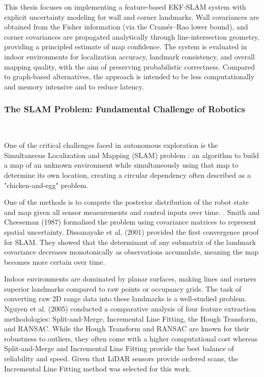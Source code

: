 \documentclass[11pt]{article}
\begin{document}
This thesis focuses on implementing a feature‑based EKF‑SLAM system with explicit uncertainty modeling for wall and corner landmarks. Wall covariances are obtained from the Fisher information (via the Cramér–Rao lower bound), and corner covariances are propagated analytically through line‑intersection geometry, providing a principled estimate of map confidence. The system is evaluated in indoor environments for localization accuracy, landmark consistency, and overall mapping quality, with the aim of preserving probabilistic correctness. Compared to graph‑based alternatives, the approach is intended to be less computationally and memory intensive and to reduce latency.




\subsubsection{The SLAM Problem: Fundamental Challenge of Robotics} 

One of the critical challenges faced in autonomous exploration is the Simultaneous Localization and Mapping (SLAM) problem \cite{durrant2006slam}: an algorithm to build a map of an unknown environment while simultaneously using that map to determine its own location, creating a circular dependency often described as a "chicken-and-egg" problem. 

One of the methods is to compute the posterior distribution of the robot state and map given all sensor measurements and control inputs over time. \cite{thrun2005probabilistic}. Smith and Cheeseman (1987) formalised the problem using covariance matrices to represent spatial uncertainty. Dissanayake et al. (2001) provided the first convergence proof for SLAM. They showed that the determinant of any submatrix of the landmark covariance decreases monotonically as observations accumulate, meaning the map becomes more certain over time\cite{Dissanayake2001}.

Indoor environments are dominated by planar surfaces, making lines and corners superior landmarks compared to raw points or occupancy grids. The task of converting raw 2D range data into these landmarks is a well-studied problem. Nguyen et al. (2005) \cite{Nguyen} conducted a comparative analysis of four feature extraction methodologies: Split-and-Merge, Incremental Line Fitting, the Hough Transform, and RANSAC. While the Hough Transform and RANSAC are known for their robustness to outliers, they often come with a higher computational cost whereas Split-and-Merge and Incremental Line Fitting provide the best balance of reliability and speed. Given that LiDAR sensors provide ordered scans, the Incremental Line Fitting method was selected for this work.
\end{document}
